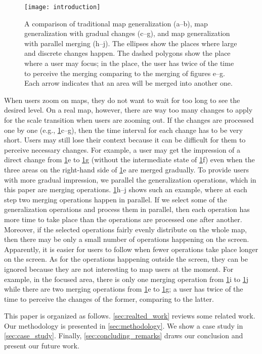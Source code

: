 \documentclass[ijgi,article,submit,moreauthors,pdftex]{Definitions/mdpi}
\begin{document}
\begin{figure}[tb]
\centering
\texttt{[image: introduction]}
\caption{A comparison of traditional map generalization (a--b),
map generalization with gradual changes (c--g),
and map generalization with parallel merging (h--j).
The ellipses show the places where large and discrete changes happen.
The dashed polygons show the place where a user may focus;
in the place, the user has twice of the time to perceive the merging
comparing to the merging of figures e--g.
Each arrow indicates that an area will be merged into another one. 
}
\label{fig:intro}
\end{figure}

When users zoom on maps, 
they do not want to wait for too long to see the desired level.
On a real map, however, 
there are way too many changes to apply for the scale transition 
when users are zooming out.
If the changes are processed one by one 
(e.g., \fig\ref{fig:intro}c--g),
then the time interval for each change has to be very short.
Users may still lose their context 
because it can be difficult for them to perceive necessary changes.
For example, a user may get the impression of
a direct change from \fig\ref{fig:intro}e to \fig\ref{fig:intro}g
(without the intermediate state of \fig\ref{fig:intro}f)
even when the three areas on the right-hand side of \fig\ref{fig:intro}e
are merged gradually.
To provide users with more gradual impression, 
we parallel the generalization operations,
which in this paper are merging operations.
\fig\ref{fig:intro}h--j shows such an example,
where at each step two merging operations happen in parallel.
If we select some of the generalization operations
and process them in parallel,
then each operation has more time to take place 
than the operations are processed one after another.
Moreover, if the selected operations
fairly evenly distribute on the whole map, 
then there may be only a small number of operations 
happening on the screen.
Apparently, it is easier for users to follow 
when fewer operations take place longer on the screen.
As for the operations happening outside the screen,
they can be ignored because 
they are not interesting to map users at the moment.
For example, in the focused area, there is only one merging operation 
from \fig\ref{fig:intro}i to \fig\ref{fig:intro}j
while there are two merging operations  
from \fig\ref{fig:intro}e to \fig\ref{fig:intro}g;
a user has twice of the time to perceive the changes of the former,
comparing to the latter.

This paper is organized as follows.
\sect\ref{sec:realted_work} reviews some related work.
Our methodology is presented in \sect\ref{sec:methodology}.
We show a case study in \sect\ref{sec:case_study}.
Finally, \sect\ref{sec:concluding_remarks} draws our conclusion
and present our future work.
\end{document}
